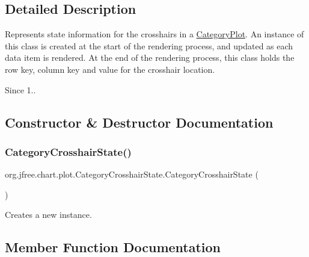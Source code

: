 \subsection{Detailed Description}
Represents state information for the crosshairs in a \mbox{\hyperlink{classorg_1_1jfree_1_1chart_1_1plot_1_1_category_plot}{Category\+Plot}}. An instance of this class is created at the start of the rendering process, and updated as each data item is rendered. At the end of the rendering process, this class holds the row key, column key and value for the crosshair location.

\begin{DoxySince}{Since}
1.. 
\end{DoxySince}


\subsection{Constructor \& Destructor Documentation}
\mbox{\label{classorg_1_1jfree_1_1chart_1_1plot_1_1_category_crosshair_state_a0452545ee51022ebc29c91d719c88020}} 
\subsubsection{\texorpdfstring{Category\+Crosshair\+State()}{CategoryCrosshairState()}}
{\footnotesize\ttfamily org.\+jfree.\+chart.\+plot.\+Category\+Crosshair\+State.\+Category\+Crosshair\+State (\begin{DoxyParamCaption}{ }\end{DoxyParamCaption})}

Creates a new instance. 

\subsection{Member Function Documentation}
\mbox{\label{classorg_1_1jfree_1_1chart_1_1plot_1_1_category_crosshair_state_ab7c311c195aa9cd49609a59c8fc69f7c}} 
